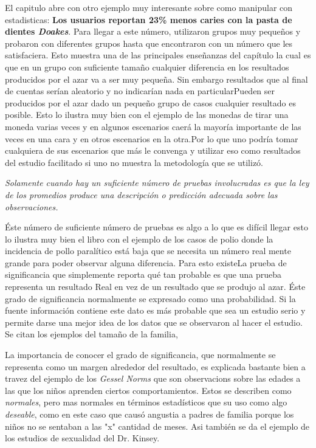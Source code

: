 \documentclass[a4paper, 11pt]{article}
\begin{document}
El capitulo abre con otro ejemplo muy interesante sobre como manipular con estadisticas: \textbf{Los usuarios reportan 23\% menos caries con la pasta de dientes \textit{Doakes}}. Para llegar a este número, utilizaron grupos muy pequeños y probaron con diferentes grupos hasta que encontraron con un número que les satisfaciera. Esto muestra una de las principales enseñanzas del capítulo la cual es que en un grupo con suficiente tamaño cualquier diferencia en los resultados producidos por el azar va a ser muy pequeña. Sin embargo resultados que al final de cuentas serían aleatorio y no indicarían nada en particularPueden ser producidos por el azar dado un pequeño grupo de casos cualquier resultado es posible. Esto lo ilustra muy bien con el ejemplo de las monedas de tirar una moneda varias veces y en algunos escenarios caerá la mayoría importante de las veces en una cara y en otros escenarios en la otra.Por lo que uno podría tomar cualquiera de sus escenarios que más le convenga y utilizar eso como resultados del estudio facilitado si uno no muestra la metodología que se utilizó.

\textit{Solamente cuando hay un suficiente número de pruebas involucradas es que la ley de los promedios produce una descripción o predicción adecuada sobre las observaciones.}

Éste número de suficiente número de pruebas es algo a lo que es difícil llegar esto lo ilustra muy bien el libro con el ejemplo de los casos de polio donde la incidencia de pollo paralítico está baja que se necesita un número real mente grande para poder observar alguna diferencia. Para esto existeLa prueba de significancia que simplemente reporta qué tan probable es que una prueba representa un resultado Real en vez de un resultado que se produjo al azar. Éste grado de significancia normalmente se expresado como una probabilidad. Si la fuente información contiene este dato es más probable que sea un estudio serio y permite darse una mejor idea de los datos que se observaron al hacer el estudio. Se citan los ejemplos del tamaño de la familia, 

La importancia de conocer el grado de significancia, que normalmente se representa como un margen alrededor del resultado, es explicada bastante bien a travez del ejemplo de los \textit{Gessel Norms} que son observacions sobre las edades a las que los niños aprenden ciertos comportamientos. Estos se describen como \textit{normales}, pero mas normales en términos estadísticos que su uso como algo \textit{deseable}, como en este caso que causó angustia a padres de familia porque los niños no se sentaban a las "x" cantidad de meses. Asi también se da el ejemplo de los estudios de sexualidad del Dr. Kinsey.
\end{document}
